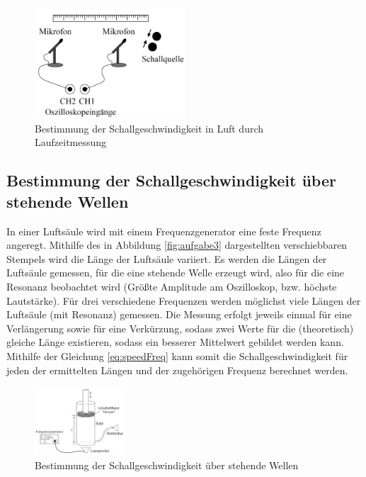 \begin{figure}
\begin{center}
\includegraphics[width=0.5\textwidth]{Bilder/Versuchsaufbau1.png}
\caption{Bestimmung der Schallgeschwindigkeit in Luft durch Laufzeitmessung}
\label{fig:versuch1}
\end{center}
\end{figure}



\subsection{Bestimmung der Schallgeschwindigkeit über stehende Wellen}
In einer Luftsäule wird mit einem Frequenzgenerator eine feste Frequenz angeregt. Mithilfe des in Abbildung \ref{fig:aufgabe3} dargestellten verschiebbaren Stempels wird die Länge der Luftsäule variiert. Es werden die Längen der Luftsäule gemessen, für die eine stehende Welle erzeugt wird, also für die eine Resonanz beobachtet wird (Größte Amplitude am Oszilloskop, bzw. höchste Lautstärke). Für drei verschiedene Frequenzen werden möglichst viele Längen der Luftsäule (mit Resonanz) gemessen. Die Messung erfolgt jeweils einmal für eine Verlängerung sowie für eine Verkürzung, sodass zwei Werte für die (theoretisch) gleiche Länge existieren, sodass ein besserer Mittelwert gebildet werden kann. Mithilfe der Gleichung \ref{eq:speedFreq} kann somit die Schallgeschwindigkeit für jeden der ermittelten Längen und der zugehörigen Frequenz berechnet werden.


\begin{figure}
\begin{center}
\includegraphics[width=0.3\textwidth]{Bilder/Versuchsaufbau3.png}
\caption{Bestimmung der Schallgeschwindigkeit über stehende Wellen}
\label{fig:versuch3}
\end{center}
\end{figure}


